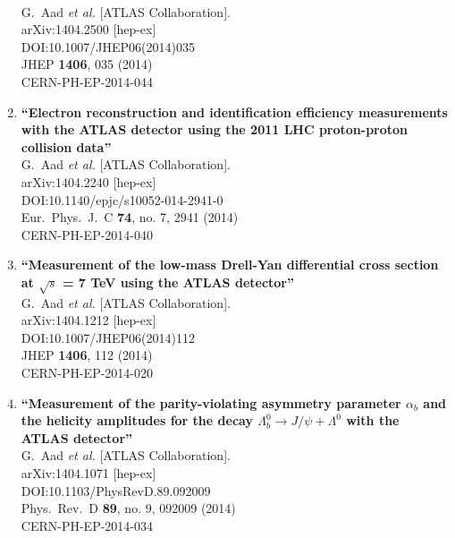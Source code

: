 \documentclass{article}
\begin{document}
\begin{enumerate}
  \\{}G.~Aad {\it et al.} [ATLAS Collaboration].
  \\{}arXiv:1404.2500 [hep-ex]
  \\{}DOI:10.1007/JHEP06(2014)035
  \\{}JHEP {\bf 1406}, 035 (2014)
  \\{}CERN-PH-EP-2014-044
\item%
{\bf ``Electron reconstruction and identification efficiency measurements with the ATLAS detector using the 2011 LHC proton-proton collision data''}
  \\{}G.~Aad {\it et al.} [ATLAS Collaboration].
  \\{}arXiv:1404.2240 [hep-ex]
  \\{}DOI:10.1140/epjc/s10052-014-2941-0
  \\{}Eur.\ Phys.\ J.\ C {\bf 74}, no. 7, 2941 (2014)
  \\{}CERN-PH-EP-2014-040
\item%
{\bf ``Measurement of the low-mass Drell-Yan differential cross section at $\sqrt{s}$ = 7 TeV using the ATLAS detector''}
  \\{}G.~Aad {\it et al.} [ATLAS Collaboration].
  \\{}arXiv:1404.1212 [hep-ex]
  \\{}DOI:10.1007/JHEP06(2014)112
  \\{}JHEP {\bf 1406}, 112 (2014)
  \\{}CERN-PH-EP-2014-020
\item%
{\bf ``Measurement of the parity-violating asymmetry parameter $\alpha_b$ and the helicity amplitudes for the decay $\Lambda_b^0\to J/\psi+\Lambda^0$ with the ATLAS detector''}
  \\{}G.~Aad {\it et al.} [ATLAS Collaboration].
  \\{}arXiv:1404.1071 [hep-ex]
  \\{}DOI:10.1103/PhysRevD.89.092009
  \\{}Phys.\ Rev.\ D {\bf 89}, no. 9, 092009 (2014)
  \\{}CERN-PH-EP-2014-034

\end{enumerate}
\end{document}

